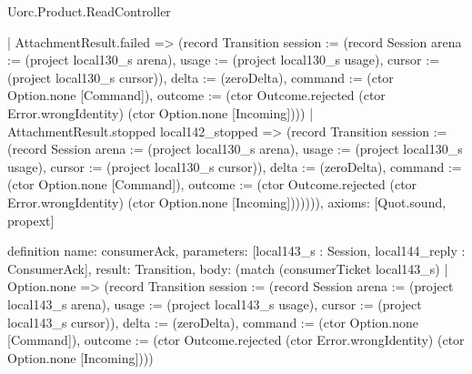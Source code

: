 \begin{lexlean}{Uorc.Product.ReadController}
\begin{semanticmodule}
{      | AttachmentResult.failed => (record Transition {session := (record Session {arena := (project local130_s arena), usage := (project local130_s usage), cursor := (project local130_s cursor)}), delta := (zeroDelta), command := (ctor Option.none [Command]), outcome := (ctor Outcome.rejected (ctor Error.wrongIdentity) (ctor Option.none [Incoming]))})
      | AttachmentResult.stopped local142_stopped => (record Transition {session := (record Session {arena := (project local130_s arena), usage := (project local130_s usage), cursor := (project local130_s cursor)}), delta := (zeroDelta), command := (ctor Option.none [Command]), outcome := (ctor Outcome.rejected (ctor Error.wrongIdentity) (ctor Option.none [Incoming]))})))),
  axioms: [Quot.sound, propext]
}

definition{
  name: consumerAck,
  parameters: [local143_s : Session, local144_reply : ConsumerAck],
  result: Transition,
  body: (match (consumerTicket local143_s)
    | Option.none => (record Transition {session := (record Session {arena := (project local143_s arena), usage := (project local143_s usage), cursor := (project local143_s cursor)}), delta := (zeroDelta), command := (ctor Option.none [Command]), outcome := (ctor Outcome.rejected (ctor Error.wrongIdentity) (ctor Option.none [Incoming]))})
}
\end{semanticmodule}
\end{lexlean}
